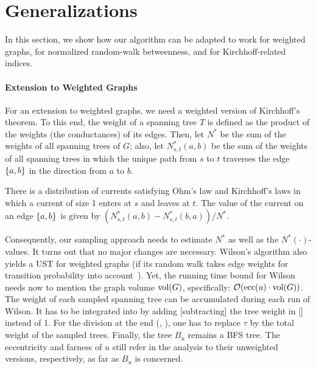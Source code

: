 \section{Generalizations}
\label{sec:el-clos:generalizations}
In this section, we show how our algorithm can be adapted to work for weighted
graphs, for normalized random-walk betweenness, and for Kirchhoff-related indices.

\paragraph{Extension to Weighted Graphs}
For an extension to weighted graphs, we need a weighted version of Kirchhoff's theorem.
To this end, the weight of a spanning tree $T$ is defined as the product of the weights
(\ie the conductances) of its edges. Then, let $N^*$ be the sum of the weights of all
spanning trees of $G$; also, let $N_{s,t}^*(a, b)$ be the sum of the weights of all spanning
trees in which the unique path from $s$ to $t$ traverses the edge $\set{a, b}$ in the direction
from $a$ to $b$.

\begin{theorem}
There is a distribution of currents satisfying Ohm's law and Kirchhoff's laws in which a current
of size 1 enters at $s$ and leaves at $t$. The value of the current on an edge $\set{a, b}$ is
given by $(N_{s, t}^*(a, b) - N_{s, t}^*(b, a))/N^*$.
\end{theorem}

Consequently, our sampling approach needs to estimate $N^*$ as well as the $N^*(\cdot)$-values.
It turns out that no major changes are necessary. Wilson's algorithm
also yields a UST for weighted graphs (if its random walk takes edge weights for transition
probability into account~\cite{DBLP:conf/stoc/Wilson96}).
Yet, the running time bound for Wilson needs now to mention the graph volume $\text{vol}(G)$, specifically:
$\mathcal{O}(\text{ecc}(u)\cdot\text{vol}(G))$. The weight of each sampled spanning tree can be accumulated during
each run of Wilson. It has to be integrated into  by adding [subtracting]
the tree weight in  [] instead of 1.
For the division at the end (, ),
one has to replace $\tau$ by the total weight of the sampled trees.
Finally, the tree $B_u$ remains a BFS tree. The eccentricity and farness of $u$ still refer in the
analysis to their unweighted versions, respectively, as far as $B_u$ is concerned.

